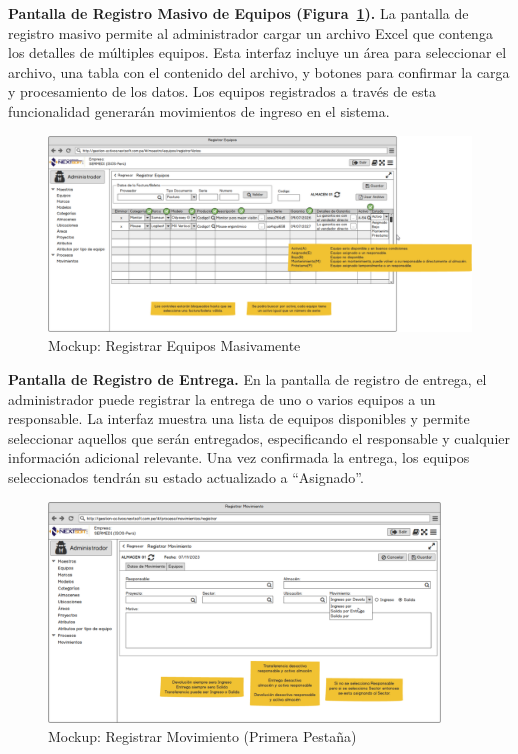 \documentclass[stu, 12pt, letterpaper, donotrepeattitle, floatsintext, natbib]{apa7}
\begin{document}
\textbf{Pantalla de Registro Masivo de Equipos (Figura~\ref{masivo}). }La pantalla de registro masivo permite al administrador cargar un
archivo Excel que contenga los detalles de múltiples equipos. Esta interfaz incluye un área para seleccionar el archivo, una tabla con el
contenido del archivo, y botones para confirmar la carga y procesamiento de los datos. Los equipos registrados a través de esta funcionalidad
generarán movimientos de ingreso en el sistema.
\begin{figure}[H]
    \centering
    \caption{Mockup: Registrar Equipos Masivamente}\label{masivo}
    \includegraphics[width=16.5cm, angle=0]{./images/registroMasivo.png}
\end{figure}
\textbf{Pantalla de Registro de Entrega. }En la pantalla de registro de entrega, el administrador puede registrar la entrega de uno o varios
equipos a un responsable. La interfaz muestra una lista de equipos disponibles y permite seleccionar aquellos que serán entregados,
especificando el responsable y cualquier información adicional relevante. Una vez confirmada la entrega, los equipos seleccionados tendrán su
estado actualizado a ``Asignado''.
\begin{figure}[H]
    \centering
    \caption{Mockup: Registrar Movimiento (Primera Pestaña)}\label{movimiento1}
    \includegraphics[width=10.4cm, angle=0]{./images/registrarMovimiento.png}
\end{figure}
\end{document}
